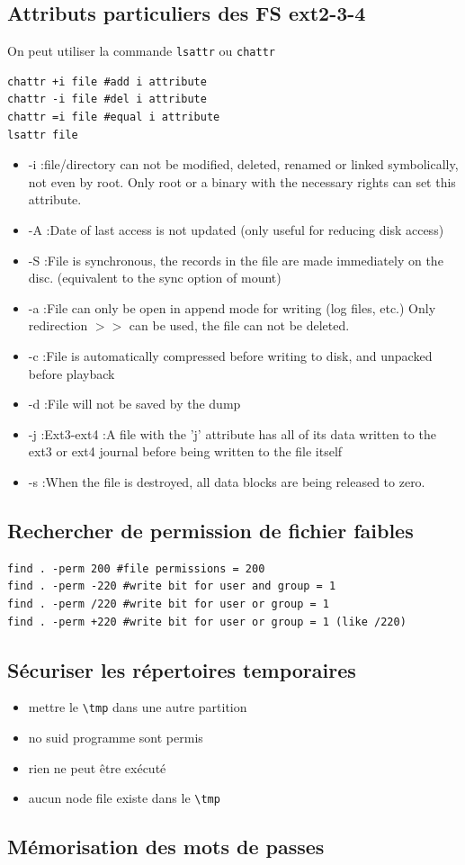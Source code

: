 \documentclass[resume]{subfiles}
\begin{document}
\subsection{Attributs particuliers des FS ext2-3-4}
On peut utiliser la commande \verb!lsattr! ou \verb!chattr!
\begin{lstlisting}[style=bash,label={lst:attribus},caption={}]
chattr +i file #add i attribute
chattr -i file #del i attribute
chattr =i file #equal i attribute
lsattr file
\end{lstlisting}
\begin{itemize}
\item -i :file/directory can not be modified, deleted, renamed or linked symbolically, not even by root. Only root or a binary with the necessary rights can set this attribute.
\item -A :Date of last access is not updated (only useful for reducing disk
access)
\item -S :File is synchronous, the records in the file are made immediately on the disc. (equivalent to the sync option of mount)
\item -a :File can only be open in append mode for writing (log files, etc.) Only redirection $>>$ can be used, the file can not be deleted.
\item -c :File is automatically compressed before writing to disk, and unpacked before playback
\item -d :File will not be saved by the dump
\item -j :Ext3-ext4 :A file with the 'j' attribute has all of its data written to
the ext3 or ext4 journal before being written to the file itself
\item -s :When the file is destroyed, all data blocks are being released to zero.
\end{itemize}

\subsection{Rechercher de permission de fichier faibles}
\begin{lstlisting}[style=bash,label={lst:attribus},caption={}]
find . -perm 200 #file permissions = 200
find . -perm -220 #write bit for user and group = 1
find . -perm /220 #write bit for user or group = 1
find . -perm +220 #write bit for user or group = 1 (like /220)
\end{lstlisting}

\subsection{Sécuriser les répertoires temporaires}
\begin{itemize}
\item mettre le \verb!\tmp! dans une autre partition
\item no suid programme sont permis
\item rien ne peut être exécuté 
\item aucun node file existe dans le \verb!\tmp!
\end{itemize}

\subsection{Mémorisation des mots de passes}
\end{document}
